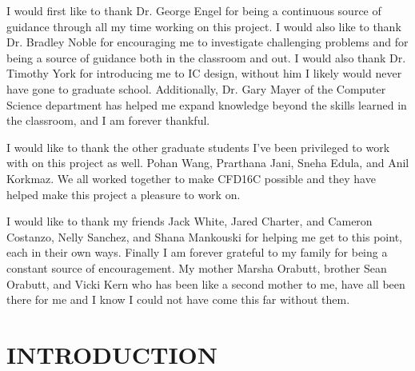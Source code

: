 \documentclass[12pt,oneside,final]{siuethesis}
\theoremstyle{definition}
\begin{document}
\begin{acknowledgements}

\par I would first like to thank Dr. George Engel for being a continuous source of guidance through all my time working on this project. I would also like to thank Dr. Bradley Noble for encouraging me to investigate challenging problems and for being a source of guidance both in the classroom and out. I would also thank Dr. Timothy York for introducing me to IC design, without him I likely would never have gone to graduate school. Additionally, Dr. Gary Mayer of the Computer Science department has helped me expand knowledge beyond the skills learned in the classroom, and I am forever thankful.
\par I would like to thank the other graduate students I've been privileged to work with on this project as well. Pohan Wang, Prarthana Jani, Sneha Edula, and Anil Korkmaz. We all worked together to make CFD16C possible and they have helped make this project a pleasure to work on.
\par I would like to thank my friends Jack White, Jared Charter, and Cameron Costanzo, Nelly Sanchez, and Shana Mankouski for helping me get to this point, each in their own ways. Finally I am forever grateful to my family for being a constant source of encouragement. My mother Marsha Orabutt, brother Sean Orabutt, and Vicki Kern who has been like a second mother to me, have all been there for me and I know I could not have come this far without them.

\end{acknowledgements}

\tableofcontents

\cleardoublepage %

\listoffigures %

\cleardoublepage

\listoftables

\mainmatter %


\chapter{INTRODUCTION}  %
\end{document}
